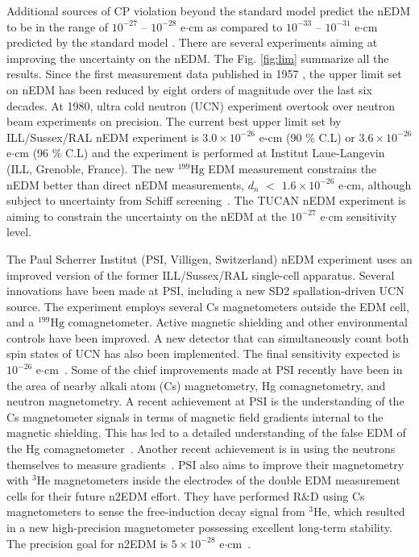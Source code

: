Additional sources of CP violation beyond the standard model predict the nEDM to be in the range of $10^{-27}$ -- $10^{-28}$  e$\cdot$cm as compared to $10^{-33}$ -- $10^{-31}$ e$\cdot$cm predicted by the standard model \cite{theory_lim_1, theory_lim_2, theory_lim_3}. There are several experiments aiming at improving the uncertainty on the nEDM. The Fig. \ref{fig:lim} summarize all the results. Since the first measurement data published in 1957 \cite{1_lim}, the upper limit set on nEDM has been reduced by eight orders of magnitude over the last six decades. At 1980, ultra cold neutron (UCN) experiment overtook over neutron beam experiments on precision. The current best upper limit set by ILL/Sussex/RAL nEDM experiment is $3.0 \times 10^{-26}$ e-cm (90 \% C.L) or $3.6 \times 10^{-26}$ e$\cdot$cm (96 \% C.L)  \cite{bestLim_1,bestLim_2} and the experiment is performed at Institut Laue-Langevin (ILL, Grenoble, France). The new $^{199}\mathrm{Hg}$ EDM measurement constrains the nEDM better than direct nEDM measurements, $d_n$ $<$   $\mathrm{1.6\times10^{-26}}$ e$\cdot$cm, although subject to uncertainty from
Schiff screening~\cite{schiff_screen}. The TUCAN nEDM experiment is aiming to constrain the uncertainty on the nEDM at the $10^{-27}$ e$\cdot$cm sensitivity level. 

The Paul Scherrer Institut
(PSI, Villigen, Switzerland) nEDM experiment uses an improved version of the former 
ILL/Sussex/RAL single-cell apparatus. Several innovations have been made at PSI, including a new SD2 spallation-driven UCN source. The experiment employs several Cs magnetometers outside the EDM cell, and a $^{199}\mathrm{Hg}$ comagnetometer. Active magnetic shielding and other environmental controls have been improved. A new detector that can simultaneously count both spin states of UCN has also been implemented. The final sensitivity expected
is $\mathrm{10^{-26}}$ e$\cdot$cm~\cite{psi}. Some of the chief improvements made at PSI recently have been in the area of nearby alkali atom (Cs) magnetometry, Hg comagnetometry, and neutron magnetometry. A recent achievement at PSI is the understanding of the Cs magnetometer signals in terms of magnetic field gradients internal to the magnetic shielding. This has led to a detailed understanding of the false EDM of the Hg comagnetometer~\cite{psi_falseEDM}. Another recent achievement is in using the neutrons themselves to measure gradients~\cite{psi_n_gradient}. PSI also aims to improve their magnetometry with $^3\mathrm{He}$ magnetometers inside the electrodes of the double EDM measurement cells for their future n2EDM effort. They have performed R$\&$D using Cs magnetometers to sense the free-induction decay signal from $^3\mathrm{He}$, which resulted in a new high-precision magnetometer possessing excellent long-term stability\cite{psi_magnetometer}. The precision goal for n2EDM is $5 \times 10^{-28}$ e$\cdot$cm~\cite{psi_n2edm_nEDM-workshop,psi_n2edm_PPNS-workshop}.



